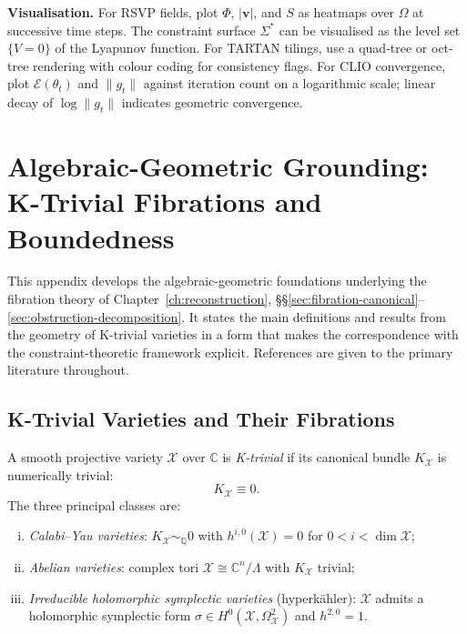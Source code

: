 \documentclass[11pt,openany]{book}
\begin{document}
\textbf{Visualisation.}  For RSVP fields, plot $\Phi$,
$|\boldsymbol{v}|$, and $S$ as heatmaps over $\Omega$ at
successive time steps.  The constraint surface $\Sigma^*$
can be visualised as the level set $\{V = 0\}$ of the
Lyapunov function.  For TARTAN tilings, use a quad-tree
or oct-tree rendering with colour coding for consistency
flags.  For CLIO convergence, plot $\mathcal{E}(\theta_t)$
and $\|g_t\|$ against iteration count on a logarithmic
scale; linear decay of $\log\|g_t\|$ indicates geometric
convergence.




\chapter[Algebraic-Geometric Grounding]{Algebraic-Geometric Grounding: K-Trivial Fibrations and Boundedness}
\label{app:algebraic-geometry}

This appendix develops the algebraic-geometric foundations
underlying the fibration theory of
Chapter~\ref{ch:reconstruction}, \S\S\ref{sec:fibration-canonical}--\ref{sec:obstruction-decomposition}.
It states the main definitions and results from the
geometry of K-trivial varieties in a form that makes the
correspondence with the constraint-theoretic framework
explicit.  References are given to the primary literature
throughout.

\section{K-Trivial Varieties and Their Fibrations}
\label{sec:k-trivial}

\begin{definition}
A smooth projective variety $\mathcal{X}$ over $\mathbb{C}$
is \emph{K-trivial} if its canonical bundle $K_{\mathcal{X}}$
is numerically trivial:
\[
  K_{\mathcal{X}} \equiv 0.
\]
The three principal classes are:
\begin{enumerate}[(i)]
  \item \emph{Calabi--Yau varieties}: $K_{\mathcal{X}}
    \sim_{\mathbb{Q}} 0$ with $h^{i,0}(\mathcal{X}) = 0$
    for $0 < i < \dim \mathcal{X}$;
  \item \emph{Abelian varieties}: complex tori $\mathcal{X}
    \cong \mathbb{C}^n / \Lambda$ with $K_{\mathcal{X}}$
    trivial;
  \item \emph{Irreducible holomorphic symplectic varieties}
    (hyperkähler): $\mathcal{X}$ admits a holomorphic
    symplectic form $\sigma \in H^0(\mathcal{X},
    \Omega^2_{\mathcal{X}})$ and $h^{2,0} = 1$.
\end{enumerate}
\end{definition}
\end{document}
